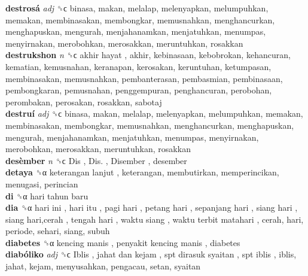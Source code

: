 \textbf{destrosá} \emph{adj}  ␝ϲ  binasa, makan, melalap, melenyapkan, melumpuhkan, memakan, membinasakan, membongkar, memusnahkan, menghancurkan, menghapuskan, mengurah, menjahanamkan, menjatuhkan, menumpas, menyirnakan, merobohkan, merosakkan, meruntuhkan, rosakkan  \\
\textbf{destrukshon} \emph{n}  ␝ϲ   akhir hayat , akhir, kebinasaan, kebobrokan, kehancuran, kematian, kemusnahan, keranapan, kerosakan, keruntuhan, ketumpasan, membinasakan, memusnahkan, pembanterasan, pembasmian, pembinasaan, pembongkaran, pemusnahan, penggempuran, penghancuran, perobohan, perombakan, perosakan, rosakkan, sabotaj  \\
\textbf{destruí} \emph{adj}  ␝ϲ  binasa, makan, melalap, melenyapkan, melumpuhkan, memakan, membinasakan, membongkar, memusnahkan, menghancurkan, menghapuskan, mengurah, menjahanamkan, menjatuhkan, menumpas, menyirnakan, merobohkan, merosakkan, meruntuhkan, rosakkan  \\
\textbf{desèmber} \emph{n}  ␝ϲ   Dis ,  Dis. ,  Disember , desember  \\
\textbf{detaya} ␝α   keterangan lanjut , keterangan, membutirkan, memperincikan, menugasi, perincian  \\
\textbf{di} ␝α   hari tahun baru   \\
\textbf{dia} ␝α   hari ini ,  hari itu ,  pagi hari ,  petang hari ,  sepanjang hari ,  siang hari ,  siang hari,cerah ,  tengah hari ,  waktu siang ,  waktu terbit matahari , cerah, hari, periode, sehari, siang, subuh  \\
\textbf{diabetes} ␝α   kencing manis ,  penyakit kencing manis , diabetes  \\
\textbf{diabóliko} \emph{adj}  ␝ϲ   Iblis ,  jahat dan kejam ,  spt dirasuk syaitan ,  spt iblis , iblis, jahat, kejam, menyusahkan, pengacau, setan, syaitan  \\
